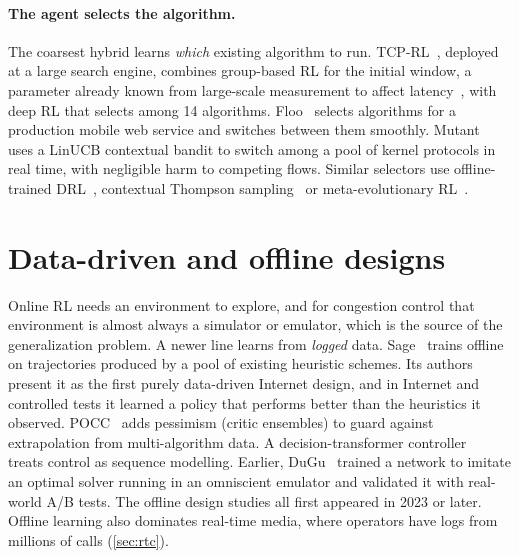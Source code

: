 \paragraph{The agent selects the algorithm.} The coarsest hybrid learns \emph{which} existing algorithm to run. TCP-RL~\cite{nie2019tcprl}, deployed at a large search engine, combines group-based RL for the initial window, a parameter already known from large-scale measurement to affect latency~\cite{dukkipati2010argument}, with deep RL that selects among 14 algorithms. Floo~\cite{zhang2023floo} selects algorithms for a production mobile web service and switches between them smoothly. Mutant~\cite{pappone2025mutant} uses a LinUCB contextual bandit to switch among a pool of kernel protocols in real time, with negligible harm to competing flows. Similar selectors use offline-trained DRL~\cite{li2026alchemy}, contextual Thompson sampling~\cite{peng2025htpccs} or meta-evolutionary RL~\cite{kanungo2026adaptive}.


\section{Data-driven and offline designs}
\label{sec:offline}

Online RL needs an environment to explore, and for congestion control that environment is almost always a simulator or emulator, which is the source of the generalization problem. A newer line learns from \emph{logged} data. Sage~\cite{yen2023sage} trains offline on trajectories produced by a pool of existing heuristic schemes. Its authors present it as the first purely data-driven Internet design, and in Internet and controlled tests it learned a policy that performs better than the heuristics it observed. POCC~\cite{jia2026pocc} adds pessimism (critic ensembles) to guard against extrapolation from multi-algorithm data. A decision-transformer controller~\cite{ji2026dtcc} treats control as sequence modelling. Earlier, DuGu~\cite{huang2022learned} trained a network to imitate an optimal solver running in an omniscient emulator and validated it with real-world A/B tests. The \nFamOff{} offline design studies all first appeared in 2023 or later. Offline learning also dominates real-time media, where operators have logs from millions of calls (\cref{sec:rtc}).


